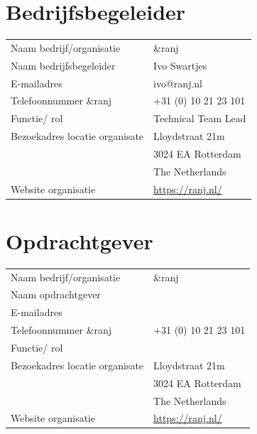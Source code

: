 \documentclass{report}
\newcommand{\organisation}{\&ranj }
\begin{document}
\section*{Bedrijfsbegeleider}
\begin{table}[h]
\begin{tabular}{ll}
Naam bedrijf/organisatie & \organisation \\
Naam bedrijfsbegeleider & Ivo Swartjes \\
E-mailadres & ivo@ranj.nl \\
Telefoonnummer \organisation & +31 (0) 10 21 23 101 \\
Functie/ rol & Technical Team Lead \\
Bezoekadres locatie organisate & Lloydstraat 21m \\ 
 & 3024 EA Rotterdam \\
 & The Netherlands \\
Website organisatie & \url{https://ranj.nl/}
\end{tabular}
\end{table}

\section*{Opdrachtgever}
\begin{table}[h]
\begin{tabular}{ll}
Naam bedrijf/organisatie & \organisation \\
Naam opdrachtgever & \\ %
E-mailadres &  \\
Telefoonnummer \organisation & +31 (0) 10 21 23 101 \\
Functie/ rol &  \\
Bezoekadres locatie organisate & Lloydstraat 21m \\ 
 & 3024 EA Rotterdam \\
 & The Netherlands \\
Website organisatie & \url{https://ranj.nl/}
\end{tabular}
\end{table}
\end{document}
